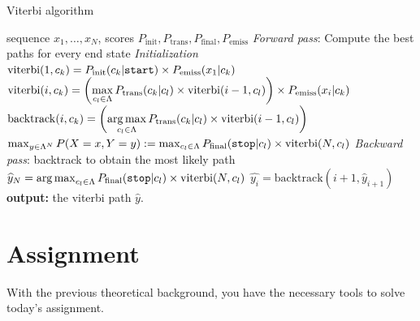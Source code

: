 \begin{algorithm}[t]
   \caption{Viterbi algorithm \label{alg:viterbi}}
\begin{algorithmic}[1]
    sequence $x_1,\ldots,x_N$, scores $P_{\mathrm{init}}, P_{\mathrm{trans}}, P_{\mathrm{final}}, P_{\mathrm{emiss}}$
        \STATE  \emph{Forward pass}: Compute the best paths for every end state
        \STATE \emph{Initialization}
        \STATE $\mathrm{viterbi}(1,c_k) = P_{\mathrm{init}}(c_k|\text{\tt start}) \times 
P_{\mathrm{emiss}}(x_1 | c_k)$
        \ENDFOR 
          \STATE $\mathrm{viterbi}(i, c_k) = \left( \displaystyle \max_{c_l \in \Lambda} P_{\mathrm{trans}}(c_k | c_l) \times \mathrm{viterbi}(i-1, c_l) \right) \times P_{\mathrm{emiss}}(x_i | c_k)$
          \STATE $\mathrm{backtrack}(i, c_k) = \left( \displaystyle \operatorname*{arg\,max}_{c_l \in \Lambda} P_{\mathrm{trans}}(c_k | c_l) \times \mathrm{viterbi}(i-1, c_l) \right)$
         \ENDFOR 
        \ENDFOR 
       \STATE 
  $\max_{y \in \Lambda^N} P(X=x,Y=y) := \max_{c_l \in \Lambda} P_{\mathrm{final}}(\text{\tt stop} | c_l) \times \mathrm{viterbi}(N, c_l)$        
        \STATE
       \STATE \emph{Backward pass}: backtrack to obtain the most likely path 
	  \STATE $\widehat{y}_N = \operatorname*{arg\,max}_{c_l \in \Lambda} P_{\mathrm{final}}(\text{\tt stop} | c_l) \times \mathrm{viterbi}(N, c_l)$ 
        \STATE $\widehat{y_i} = \mathrm{backtrack}(i+1, \widehat{y}_{i+1})$
        \ENDFOR 
       \STATE \textbf{output:} the viterbi path $\widehat{y}$.
\end{algorithmic}
\end{algorithm}

\section{Assignment}

With the previous theoretical background, you have the necessary tools to solve today's assignment.

